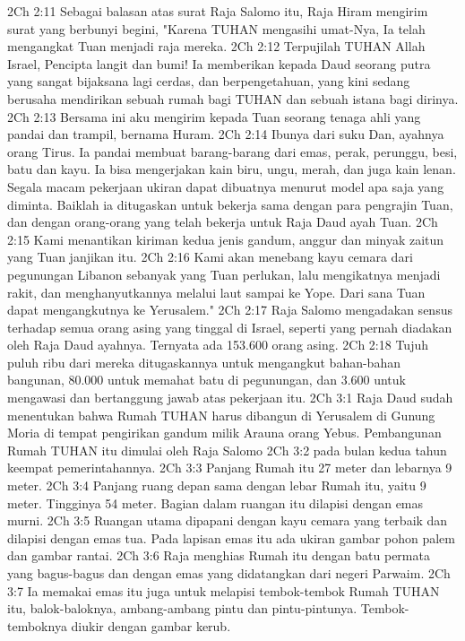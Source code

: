 2Ch 2:11  Sebagai balasan atas surat Raja Salomo itu, Raja Hiram mengirim surat yang berbunyi begini, "Karena TUHAN mengasihi umat-Nya, Ia telah mengangkat Tuan menjadi raja mereka.
2Ch 2:12  Terpujilah TUHAN Allah Israel, Pencipta langit dan bumi! Ia memberikan kepada Daud seorang putra yang sangat bijaksana lagi cerdas, dan berpengetahuan, yang kini sedang berusaha mendirikan sebuah rumah bagi TUHAN dan sebuah istana bagi dirinya.
2Ch 2:13  Bersama ini aku mengirim kepada Tuan seorang tenaga ahli yang pandai dan trampil, bernama Huram.
2Ch 2:14  Ibunya dari suku Dan, ayahnya orang Tirus. Ia pandai membuat barang-barang dari emas, perak, perunggu, besi, batu dan kayu. Ia bisa mengerjakan kain biru, ungu, merah, dan juga kain lenan. Segala macam pekerjaan ukiran dapat dibuatnya menurut model apa saja yang diminta. Baiklah ia ditugaskan untuk bekerja sama dengan para pengrajin Tuan, dan dengan orang-orang yang telah bekerja untuk Raja Daud ayah Tuan.
2Ch 2:15  Kami menantikan kiriman kedua jenis gandum, anggur dan minyak zaitun yang Tuan janjikan itu.
2Ch 2:16  Kami akan menebang kayu cemara dari pegunungan Libanon sebanyak yang Tuan perlukan, lalu mengikatnya menjadi rakit, dan menghanyutkannya melalui laut sampai ke Yope. Dari sana Tuan dapat mengangkutnya ke Yerusalem."
2Ch 2:17  Raja Salomo mengadakan sensus terhadap semua orang asing yang tinggal di Israel, seperti yang pernah diadakan oleh Raja Daud ayahnya. Ternyata ada 153.600 orang asing.
2Ch 2:18  Tujuh puluh ribu dari mereka ditugaskannya untuk mengangkut bahan-bahan bangunan, 80.000 untuk memahat batu di pegunungan, dan 3.600 untuk mengawasi dan bertanggung jawab atas pekerjaan itu.
2Ch 3:1  Raja Daud sudah menentukan bahwa Rumah TUHAN harus dibangun di Yerusalem di Gunung Moria di tempat pengirikan gandum milik Arauna orang Yebus. Pembangunan Rumah TUHAN itu dimulai oleh Raja Salomo
2Ch 3:2  pada bulan kedua tahun keempat pemerintahannya.
2Ch 3:3  Panjang Rumah itu 27 meter dan lebarnya 9 meter.
2Ch 3:4  Panjang ruang depan sama dengan lebar Rumah itu, yaitu 9 meter. Tingginya 54 meter. Bagian dalam ruangan itu dilapisi dengan emas murni.
2Ch 3:5  Ruangan utama dipapani dengan kayu cemara yang terbaik dan dilapisi dengan emas tua. Pada lapisan emas itu ada ukiran gambar pohon palem dan gambar rantai.
2Ch 3:6  Raja menghias Rumah itu dengan batu permata yang bagus-bagus dan dengan emas yang didatangkan dari negeri Parwaim.
2Ch 3:7  Ia memakai emas itu juga untuk melapisi tembok-tembok Rumah TUHAN itu, balok-baloknya, ambang-ambang pintu dan pintu-pintunya. Tembok-temboknya diukir dengan gambar kerub.
